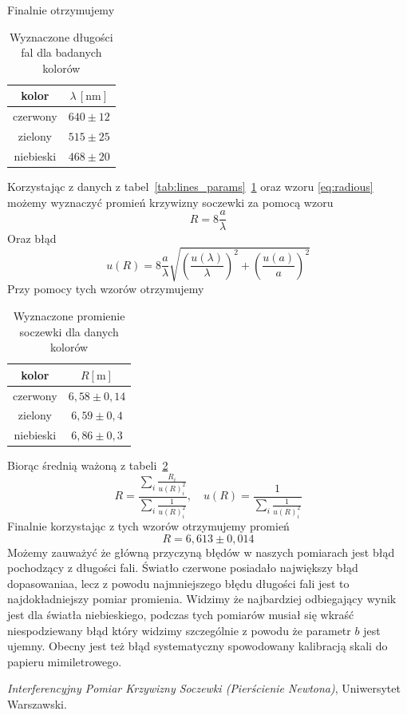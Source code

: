 \documentclass[12pt]{article}
\begin{document}
Finalnie otrzymujemy
\begin{table}[H]
	\centering
	\begin{tabular}{c|c}
		\toprule
		kolor     & \(\lambda \, [\mathrm{nm}]\) \\
		\midrule
		czerwony  & \(640 \pm 12\)               \\
		zielony   & \(515 \pm 25\)               \\
		niebieski & \(468 \pm 20\)               \\
		\bottomrule
	\end{tabular}
	\caption{Wyznaczone długości fal dla badanych kolorów}
	\label{tab:wavelength}
\end{table}

Korzystając z danych z tabel~\ref{tab:lines_params}~\ref{tab:wavelength} oraz wzoru \eqref{eq:radious} możemy wyznaczyć promień krzywizny soczewki za pomocą wzoru
\[
	R = 8\frac{a}{\lambda}
\]
Oraz błąd
\[
	u(R) = 8\frac{a}{\lambda} \sqrt{(\frac{u(\lambda)}{\lambda})^2 + (\frac{u(a)}{a})^2}
\]
Przy pomocy tych wzorów otrzymujemy

\begin{table}[H]
	\centering
	\begin{tabular}{c|c}
		\toprule
		kolor     & \(R [\mathrm{m}]\)    \\
		\midrule
		czerwony  & \(6{,}58 \pm 0{,}14\) \\
		zielony   & \(6{,}59 \pm 0{,}4\)  \\
		niebieski & \(6{,}86 \pm 0{,}3 \) \\
		\bottomrule
	\end{tabular}
	\caption{Wyznaczone promienie soczewki dla danych kolorów}
	\label{tab:radious}
\end{table}

Biorąc średnią ważoną z tabeli~\ref{tab:radious}
\[
	R = \frac{\sum_i \frac{R_i}{u(R)_i^2}}{\sum_i \frac{1}{u(R)_i^2}}, \quad u(R) = \frac{1}{\sum_i \frac{1}{u(R)_i^2}}
\]
Finalnie korzystając z tych wzorów otrzymujemy promień
\[
	R = 6{,}613 \pm 0{,}014
\]
Możemy zauważyć że główną przyczyną błędów w naszych pomiarach jest błąd pochodzący z długości fali. Światło czerwone posiadało największy błąd dopasowaniaa, lecz z powodu najmniejszego błędu długości fali jest to najdokładniejszy pomiar promienia. Widzimy że najbardziej odbiegający wynik jest dla światła niebieskiego, podczas tych pomiarów musiał się wkraść niespodziewany błąd który widzimy szczególnie z powodu że parametr \(b\) jest ujemny. Obecny jest też błąd systematyczny spowodowany kalibracją skali do papieru mimiletrowego.

\newpage


\begin{thebibliography}{1}

	\emph{Interferencyjny Pomiar Krzywizny Soczewki (Pierścienie Newtona)}, Uniwersytet Warszawski.

\end{thebibliography}
\end{document}
